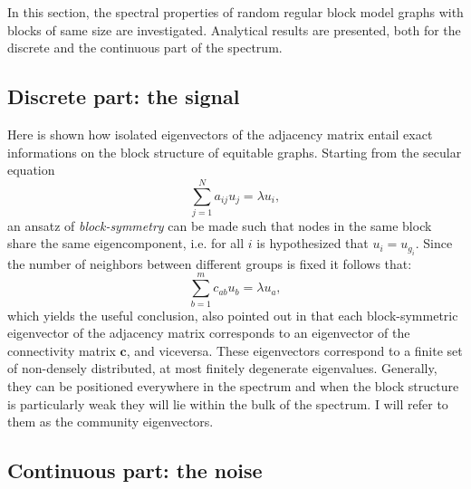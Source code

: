 \documentclass[%
 reprint,
 amsmath,amssymb,
 aps,
 pre,
 showpacs
]{revtex4-1}
\begin{document}
In this section, the spectral properties of random regular block model graphs with blocks of same size are investigated. Analytical results are presented, both for the discrete and the continuous part of the spectrum. 
\subsection{Discrete part: the signal}
Here is shown how isolated eigenvectors of the adjacency matrix entail exact informations on the block structure of equitable graphs. Starting from the secular equation
\begin{equation}\label{eq:secEqA}
\underset{j=1}{\overset{N}{\sum}}a_{ij}u_{j}=\lambda u_{i},
\end{equation}
an ansatz of \textit{block-symmetry} can be made such that nodes in the same block share the same eigencomponent, i.e. for all $i$ is hypothesized that $u_i = u_{g_i}$. Since the number of neighbors
between different groups is fixed it follows that:
\begin{equation}\label{eq:secEqC}
\underset{b=1}{\overset{m}{\sum}}c_{ab}u_{b}=\lambda u_{a},
\end{equation}
which yields the useful conclusion, also pointed out in \cite{brito2016recovery,newman2014equitable} that each block-symmetric eigenvector of the adjacency matrix corresponds to an eigenvector of the connectivity matrix $\mathbf{c}$, and viceversa. These eigenvectors correspond to a finite set of non-densely distributed, at most finitely degenerate eigenvalues. Generally, they can be positioned everywhere in the spectrum and when the block structure is particularly weak they will lie within the bulk of the spectrum. I will refer to them as the community eigenvectors.

\subsection{Continuous part: the noise}
\end{document}
